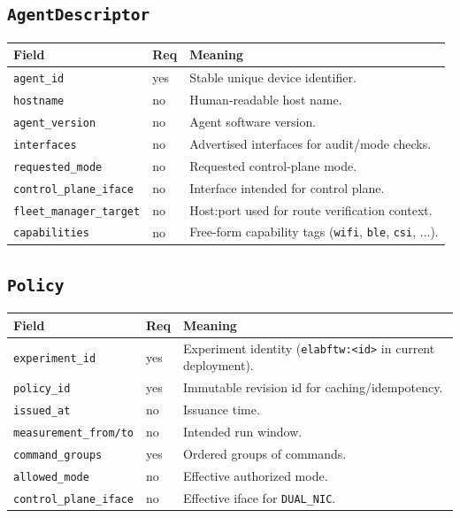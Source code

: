 \documentclass[11pt,a4paper]{article}
\begin{document}
\subsection{\texttt{AgentDescriptor}}
\begin{longtable}{p{4.1cm}p{1.6cm}p{9.3cm}}
\textbf{Field} & \textbf{Req} & \textbf{Meaning} \\
\hline
\endhead
\texttt{agent\_id} & yes & Stable unique device identifier. \\
\texttt{hostname} & no & Human-readable host name. \\
\texttt{agent\_version} & no & Agent software version. \\
\texttt{interfaces} & no & Advertised interfaces for audit/mode checks. \\
\texttt{requested\_mode} & no & Requested control-plane mode. \\
\texttt{control\_plane\_iface} & no & Interface intended for control plane. \\
\texttt{fleet\_manager\_target} & no & Host:port used for route verification context. \\
\texttt{capabilities} & no & Free-form capability tags (\texttt{wifi}, \texttt{ble}, \texttt{csi}, ...). \\
\hline
\end{longtable}

\subsection{\texttt{Policy}}
\begin{longtable}{p{4.1cm}p{1.6cm}p{9.3cm}}
\textbf{Field} & \textbf{Req} & \textbf{Meaning} \\
\hline
\endhead
\texttt{experiment\_id} & yes & Experiment identity (\texttt{elabftw:<id>} in current deployment). \\
\texttt{policy\_id} & yes & Immutable revision id for caching/idempotency. \\
\texttt{issued\_at} & no & Issuance time. \\
\texttt{measurement\_from/to} & no & Intended run window. \\
\texttt{command\_groups} & yes & Ordered groups of commands. \\
\texttt{allowed\_mode} & no & Effective authorized mode. \\
\texttt{control\_plane\_iface} & no & Effective iface for \texttt{DUAL\_NIC}. \\
\hline
\end{longtable}
\end{document}
